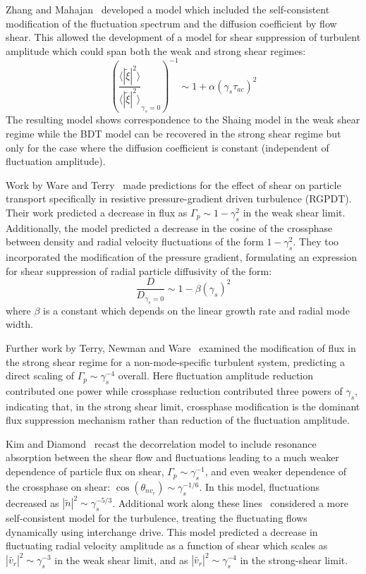 \documentclass[aip,pop,amsmath,amssymb,peprint,superscriptaddress]{revtex4-1} %
\begin{document}
Zhang and Mahajan~\cite{zhang92,zhang93} developed a model which
included the self-consistent modification of the fluctuation spectrum
and the diffusion coefficient by flow shear.  This allowed the
development of a model for shear suppression of turbulent amplitude which could span both the weak and strong shear regimes:
%
\begin{equation}
\left(\frac{\langle |\tilde{\xi}|^{2} \rangle}{\langle |\tilde{\xi}|^{2} \rangle}_{\gamma_{s}=0}\right)^{-1} \sim 1+\alpha(\gamma_{s}\tau_{ac})^2
\label{eq:zm_theory}
\end{equation}
%
The resulting model shows correspondence to the Shaing model in the weak shear regime while the BDT model can be recovered in the strong shear regime but only for the case where the diffusion coefficient is constant (independent of fluctuation amplitude).

Work by Ware and Terry~\cite{ware96,ware98} made predictions for the
effect of shear on particle transport specifically in resistive
pressure-gradient driven turbulence (RGPDT). Their work predicted a decrease in flux as $\Gamma_{p} \sim 1-\gamma_{s}^2$ in the weak shear limit.  Additionally,  the model predicted a decrease in the cosine of the crossphase between density and radial velocity fluctuations of the form $1-\gamma_{s}^2$. They too incorporated the modification of the pressure gradient, formulating an expression for shear suppression of radial particle diffusivity of the form:
%
\begin{equation}
\frac{D}{D_{\gamma_{s}=0}} \sim 1-\beta(\gamma_{s})^2
\label{eq:ware_diff_theory}
\end{equation}
%
where $\beta$ is a constant which depends on the linear growth rate and radial mode width.

Further work by Terry, Newman and Ware~\cite{terry01} examined the modification of flux in the strong shear regime for a non-mode-specific turbulent system, predicting a direct scaling of $\Gamma_{p} \sim \gamma_{s}^{-4}$ overall.  Here fluctuation amplitude reduction contributed one power while crossphase reduction contributed three powers of $\gamma_s$, indicating that, in the strong shear limit, crossphase modification is the dominant flux suppression mechanism rather than reduction of the fluctuation amplitude. 

Kim and Diamond~\cite{kim03} recast the decorrelation model to include resonance absorption between the shear flow and fluctuations leading to a much weaker dependence of particle flux on shear, $\Gamma_{p} \sim \gamma_{s}^{-1}$, and even weaker dependence of the crossphase on shear: $\cos(\theta_{nv_{r}}) \sim \gamma_{s}^{-1/6}$.  In this model, fluctuations decreased as $|\tilde{n}|^{2} \sim \gamma_{s}^{-5/3}$. Additional work along these lines~\cite{kim04} considered a more self-consistent model for the turbulence, treating the fluctuating flows dynamically using interchange drive.  This model predicted a decrease in fluctuating radial velocity amplitude as a function of shear which scales as $|\tilde{v_{r}}|^{2} \sim \gamma_{s}^{-3}$ in the weak shear limit, and as $|\tilde{v_{r}}|^{2} \sim \gamma_{s}^{-4}$ in the strong-shear limit.
\end{document}
